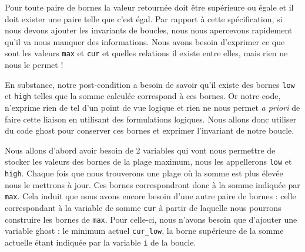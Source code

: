 \documentclass[12pt,francais,]{scrbook}
\begin{document}
Pour toute paire de bornes la valeur retournée doit être supérieure ou
égale et il doit exister une paire telle que c'est égal. Par rapport à
cette spécification, si nous devons ajouter les invariants de boucles,
nous nous apercevons rapidement qu'il va nous manquer des informations.
Nous avons besoin d'exprimer ce que sont les valeurs \texttt{max} et
\texttt{cur} et quelles relations il existe entre elles, mais rien ne
nous le permet !

En substance, notre post-condition a besoin de savoir qu'il existe des
bornes \texttt{low} et \texttt{high} telles que la somme calculée
correspond à ces bornes. Or notre code, n'exprime rien de tel d'un point
de vue logique et rien ne nous permet \emph{a priori} de faire cette
liaison en utilisant des formulations logiques. Nous allons donc
utiliser du code ghost pour conserver ces bornes et exprimer l'invariant
de notre boucle.

Nous allons d'abord avoir besoin de 2 variables qui vont nous permettre
de stocker les valeurs des bornes de la plage maximum, nous les
appellerons \texttt{low} et \texttt{high}. Chaque fois que nous
trouverons une plage où la somme est plus élevée nous le mettrons à
jour. Ces bornes correspondront donc à la somme indiquée par
\texttt{max}. Cela induit que nous avons encore besoin d'une autre paire
de bornes : celle correspondant à la variable de somme \texttt{cur} à
partir de laquelle nous pourrons construire les bornes de \texttt{max}.
Pour celle-ci, nous n'avons besoin que d'ajouter une variable ghost : le
minimum actuel \texttt{cur\_low}, la borne supérieure de la somme
actuelle étant indiquée par la variable \texttt{i} de la boucle.
\end{document}
